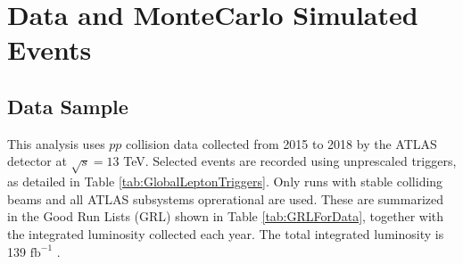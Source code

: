 \section{Data and MonteCarlo Simulated Events}
\label{sec:DataAndMC}

\subsection{Data Sample}
\label{subsec:DataSample}

This analysis uses $pp$ collision data collected from 2015 to 2018 by the ATLAS detector at $\sqrt{s}=13$ TeV. Selected events are recorded using unprescaled triggers, as detailed in Table \ref{tab:GlobalLeptonTriggers}. Only runs with stable colliding beams and all ATLAS subsystems oprerational are used. These are summarized in the Good Run Lists (GRL) shown in Table \ref{tab:GRLForData}, together with the integrated luminosity collected each year. The total integrated luminosity is 139 $\text{fb}^{-1}$ \cite{ATLAS-CONF-2019-021}.

\begin{table}[H]
  \centering
  \\
  \caption{Single-electron (a) and single-muon (b) trigger menus used depending on the year of data-taking.}
  \label{tab:GlobalLeptonTriggers}
\end{table}


